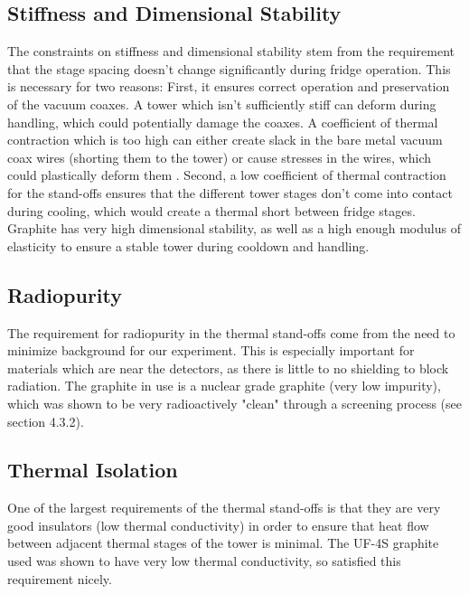 \documentclass{report}
\begin{document}
\subsection{Stiffness and Dimensional Stability}
The constraints on stiffness and dimensional stability stem from the requirement that the stage spacing doesn't change significantly during fridge operation. This is necessary for two reasons: First, it ensures correct operation and preservation of the vacuum coaxes. A tower which isn't sufficiently stiff can deform during handling, which could potentially damage the coaxes. A coefficient of thermal contraction which is too high can either create slack in the bare metal vacuum coax wires (shorting them to the tower) or cause stresses in the wires, which could plastically deform them \footnotemark.  Second, a low coefficient of thermal contraction for the stand-offs ensures that the different tower stages don't come into contact during cooling, which would create a thermal short between fridge stages\footnotemark. Graphite has very high dimensional stability, as well as a high enough modulus of elasticity to ensure a stable tower during cooldown and handling.


\subsection{Radiopurity}
The requirement for radiopurity in the thermal stand-offs come from the need to minimize background for our experiment. This is especially important for materials which are near the detectors, as there is little to no shielding to block radiation. The graphite in use is a nuclear grade graphite (very low impurity), which was shown to be very radioactively "clean" through a screening process (see section 4.3.2).

\subsection{Thermal Isolation}
One of the largest requirements of the thermal stand-offs is that they are very good insulators (low thermal conductivity) in order to ensure that heat flow between adjacent thermal stages of the tower is minimal. The UF-4S graphite used was shown to have very low thermal conductivity, so satisfied this requirement nicely.
\end{document}
